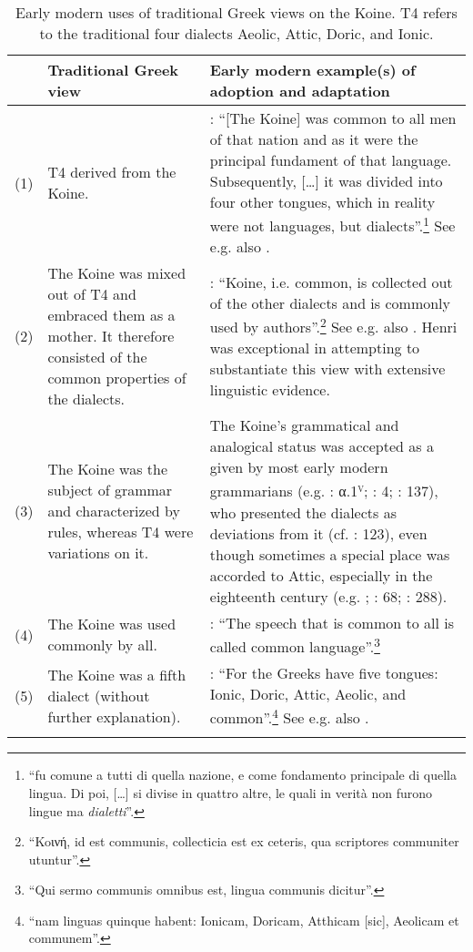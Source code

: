 \begin{sidewaystable}\footnotesize
\caption{Early modern uses of traditional Greek views on the Koine. T4 refers to the traditional four dialects Aeolic, Attic, Doric, and Ionic.\label{tab:2.2}}
\begin{tabularx}{\textwidth}{l@{ }QQ}
\lsptoprule 
 & {Traditional Greek view} & Early modern example(s) of adoption and adaptation\\\midrule
 (1) & T4 derived from the Koine. & \citet[335]{Borghini1971}: “[The Koine] was common to all men of that nation and as it were the principal fundament of that language. Subsequently, […] it was divided into four other tongues, which in reality were not languages, but dialects”.\footnote{“fu comune a tutti di quella nazione, e come fondamento principale di quella lingua. Di poi, […] si divise in quattro altre, le quali in verità non furono lingue ma \textit{dialetti}”.} See e.g. also \citet[209]{Vergara1537}.\\
 (2) & The Koine was mixed out of T4 and embraced them as a mother. It therefore consisted of the common properties of the dialects. & \citet[52]{Oecolampadius1518}: “Koine, i.e. common, is collected out of the other dialects and is commonly used by authors”.\footnote{“Koινή, id est communis, collecticia est ex ceteris, qua scriptores communiter utuntur”.} See e.g. also \citet[10\textsc{\textsuperscript{r}}\textsc{–10}\textsc{\textsuperscript{v}}]{Girard1541}. Henri \citet[28--34]{Estienne1581} was exceptional in attempting to substantiate this view with extensive linguistic evidence.\\
 (3) & The Koine was the subject of grammar and characterized by rules, whereas T4 were variations on it. & The Koine’s grammatical and analogical status was accepted as a given by most early modern grammarians (e.g. \citealt{Gaza1495}: α.1\textsc{\textsuperscript{v}}; \citealt{Schmidt1604}: 4; \citealt{Walch1772}: 137), who presented the dialects as deviations from it (cf. \citealt{Ciccolella2008}: 123), even though sometimes a special place was accorded to Attic, especially in the eighteenth century (e.g. \citealt{Luscinius1517}; \citealt{Hemsterhuis1721}: 68; \citealt{Jehne1782}: 288).\\
 (4) & The Koine was used commonly by all. & \citet[a.i\textsc{\textsuperscript{v}}]{Melanchthon1518}: “The speech that is common to all is called common language”.\footnote{“Qui sermo communis omnibus est, lingua communis dicitur”.}\\
 (5) & The Koine was a fifth dialect (without further explanation). & \citet[138\textsc{\textsuperscript{v}}]{Beroaldo1493}: “For the Greeks have five tongues: Ionic, Doric, Attic, Aeolic, and common”.\footnote{“nam linguas quinque habent: Ionicam, Doricam, Atthicam [sic], Aeolicam et communem”.} See e.g. also \citet[85\textsc{\textsuperscript{r}}]{Perotti1489}.\\
\lspbottomrule
\end{tabularx}
\end{sidewaystable}

